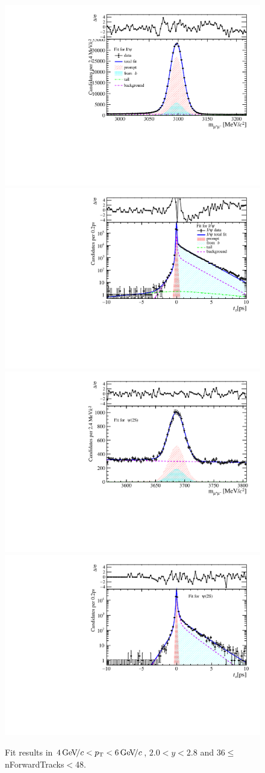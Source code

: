 \begin{figure}[H]
\begin{center}
\includegraphics[width=0.47\linewidth]{pdf/Jpsi/drawmassF/n4y1pt3.pdf}
\includegraphics[width=0.47\linewidth]{pdf/Jpsi/2DFitF/n4y1pt3.pdf}
\vspace*{-0.5cm}
\includegraphics[width=0.47\linewidth]{pdf/Psi2S/drawmassF/n4y1pt3.pdf}
\includegraphics[width=0.47\linewidth]{pdf/Psi2S/2DFitF/n4y1pt3.pdf}
\vspace*{-0.5cm}
\end{center}
\caption{Fit results in $4\text{\,Ge\kern -0.1em V\!/}c<p_{\mathrm{T}}<6\text{\,Ge\kern -0.1em V\!/}c$, $2.0<y<2.8$ and 36$\leq$nForwardTracks$<$48.}
\label{Fitn4y1pt3}
\end{figure}
